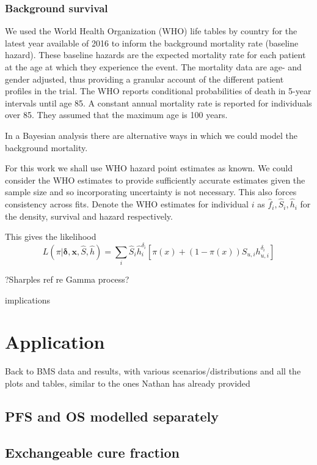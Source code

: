 \documentclass[AMA,STIX1COL]{WileyNJD-v2}
\begin{document}
\subsubsection{Background survival}
We used the World Health Organization
(WHO) life tables by country for the latest year available of 2016
\cite{wholifetables} to inform the background mortality rate (baseline
hazard). These baseline hazards are the expected mortality rate for each
patient at the age at which they experience the event. The mortality
data are age- and gender adjusted, thus providing a granular account of
the different patient profiles in the trial. The WHO reports conditional
probabilities of death in 5-year intervals until age 85. A constant
annual mortality rate is reported for individuals over 85. They assumed
that the maximum age is 100 years.

In a Bayesian analysis there are alternative ways in which we could
model the background mortality.

For this work we shall use WHO hazard point estimates as known. We could
consider the WHO estimates to provide sufficiently accurate estimates
given the sample size and so incorporating uncertainty is not necessary.
This also forces consistency across fits. Denote the WHO estimates for
individual $i$ as $\hat{f}_i, \hat{S}_i, \hat{h}_i$ for the density,
survival and hazard respectively.

This gives the likelihood
$$
L(\pi | \boldsymbol{\delta}, \boldsymbol{x}, \hat{S}, \hat{h}) =
\sum_i \hat{S}_i \hat{h}_i^{\delta_i} \left[ \pi(x) + (1 - \pi(x)) S_{u, i} h_{u , i}^{\delta_i} \right]
$$

?Sharples ref re Gamma process?


implications




\section{Application}\label{sec:application}

Back to BMS data and results, with various scenarios/distributions and all the plots and tables, similar to the ones Nathan has already provided

\subsection{PFS and OS modelled separately}
\subsection{Exchangeable cure fraction}
\end{document}

